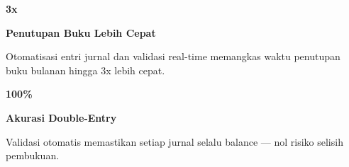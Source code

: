 \documentclass[a4paper]{article}
\begin{document}
\noindent
\begin{minipage}[t]{0.485\textwidth}
    \noindent\colorbox{BlueBg}{%
        \begin{minipage}[t]{\dimexpr\linewidth-2\fboxsep}
            \vspace{6pt}
            {\fontsize{20}{24}\selectfont\bfseries\color{BluePrimary} 3x}\par\vspace{2pt}
            {\fontsize{9.5}{12}\selectfont\bfseries\color{BlueDark} Penutupan Buku Lebih Cepat}\par\vspace{2pt}
            {\fontsize{8.5}{11}\selectfont\color{TextDark}Otomatisasi entri jurnal dan validasi real-time memangkas waktu penutupan buku bulanan hingga 3x lebih cepat.}%
            \vspace{6pt}
        \end{minipage}}%
    \vspace{6pt}
    \noindent\colorbox{BlueBg}{%
        \begin{minipage}[t]{\dimexpr\linewidth-2\fboxsep}
            \vspace{6pt}
            {\fontsize{20}{24}\selectfont\bfseries\color{BluePrimary} 100\%}\par\vspace{2pt}
            {\fontsize{9.5}{12}\selectfont\bfseries\color{BlueDark} Akurasi Double-Entry}\par\vspace{2pt}
            {\fontsize{8.5}{11}\selectfont\color{TextDark}Validasi otomatis memastikan setiap jurnal selalu balance — nol risiko selisih pembukuan.}%
            \vspace{6pt}
        \end{minipage}}%
\end{minipage}%
\hfill
\end{document}
